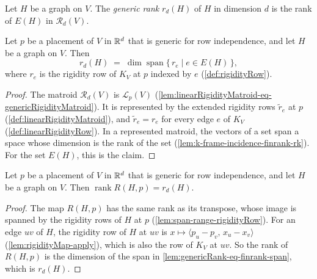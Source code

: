 \begin{definition}
  \label{def:genericRank}
  \leanok
  Let $H$ be a graph on $V$. The \emph{generic rank} $r_d(H)$ of $H$ in
  dimension $d$ is the rank of $E(H)$ in $\mathcal{R}_d(V)$.
\end{definition}

\begin{lemma}
  \label{lem:genericRank-eq-finrank-span}
  \leanok
  Let $p$ be a placement of $V$ in ${\mathbb{R}}^{d}$ that is generic for row
  independence, and let $H$ be a graph on $V$. Then
  \[
    r_d(H) \;=\; \dim \operatorname{span}
      \{\, r_e \mid e \in E(H) \,\},
  \]
  where $r_e$ is the rigidity row of $K_V$ at $p$ indexed by $e$
  (\cref{def:rigidityRow}).
\end{lemma}
\begin{proof}
  \leanok
  The matroid $\mathcal{R}_d(V)$ is $\mathcal{L}_p(V)$
  (\cref{lem:linearRigidityMatroid-eq-genericRigidityMatroid}). It is
  represented by the extended rigidity rows $\tilde r_e$ at $p$
  (\cref{def:linearRigidityMatroid}), and $\tilde r_e = r_e$ for every
  edge $e$ of $K_V$ (\cref{def:linearRigidityRow}). In a represented
  matroid, the vectors of a set span a space whose dimension is the
  rank of the set (\cref{lem:k-frame-incidence-finrank-rk}). For the
  set $E(H)$, this is the claim.
\end{proof}

\begin{lemma}
  \label{lem:rigidityMap-rank-at-generic}
  \leanok
  Let $p$ be a placement of $V$ in ${\mathbb{R}}^{d}$ that is generic for row
  independence, and let $H$ be a graph on $V$. Then
  $\operatorname{rank} R(H, p) = r_d(H)$.
\end{lemma}
\begin{proof}
  \leanok
  The map $R(H, p)$ has the same rank as its transpose, whose image is
  spanned by the rigidity rows of $H$ at $p$
  (\cref{lem:span-range-rigidityRow}). For an edge $uv$ of $H$, the
  rigidity row of $H$ at $uv$ is
  $x \mapsto \langle p_u - p_v,\, x_u - x_v \rangle$
  (\cref{lem:rigidityMap-apply}), which is also the row of $K_V$ at
  $uv$. So the rank of $R(H, p)$ is the dimension of the span in
  \cref{lem:genericRank-eq-finrank-span}, which is $r_d(H)$.
\end{proof}
